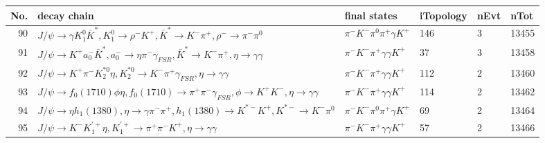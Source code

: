 \begin{table}[htbp] 
\begin{center}
\begin{small}
\begin{tabular}{rlllll}\hline\hline
 No. & decay chain & final states &  iTopology & nEvt & nTot \\\hline
 90&$J/\psi       \rightarrow \gamma       K_1^{0}        \bar{K}^{*}   , K_1^{0}         \rightarrow \rho^{-}      K^{+}          , \bar{K}^{*}    \rightarrow K^{-}          \pi^{+}        , \rho^{-}       \rightarrow \pi^{-}        \pi^{0}        $&$\pi^{-}        K^{-}          \pi^{0}        \pi^{+}        \gamma       K^{+}          $&  146&    3&13455\\
 91&$J/\psi       \rightarrow K^{+}          a_{0}^{-}      \bar{K}^{*}   , a_{0}^{-}       \rightarrow \eta          \pi^{-}        \gamma_{FSR} , \bar{K}^{*}    \rightarrow K^{-}          \pi^{+}        , \eta           \rightarrow \gamma       \gamma       $&$\pi^{-}        K^{-}          \pi^{+}        \gamma       \gamma       K^{+}          $&   37&    3&13458\\
 92&$J/\psi       \rightarrow K^{+}          \pi^{-}        K_2^{*0}       \eta          , K_2^{*0}        \rightarrow K^{-}          \pi^{+}        \gamma_{FSR} , \eta           \rightarrow \gamma       \gamma       $&$\pi^{-}        K^{-}          \pi^{+}        \gamma       \gamma       K^{+}          $&  112&    2&13460\\
 93&$J/\psi       \rightarrow f_{0}(1710)    \phi           \eta          , f_{0}(1710)     \rightarrow \pi^{+}        \pi^{-}        \gamma_{FSR} , \phi            \rightarrow K^{+}          K^{-}          , \eta           \rightarrow \gamma       \gamma       $&$\pi^{-}        K^{-}          \pi^{+}        \gamma       \gamma       K^{+}          $&  114&    2&13462\\
 94&$J/\psi       \rightarrow \eta          h_{1}(1380)    , \eta           \rightarrow \gamma       \pi^{-}        \pi^{+}        , h_{1}(1380)     \rightarrow K^{*-}         K^{+}          , K^{*-}          \rightarrow K^{-}          \pi^{0}        $&$\pi^{-}        K^{-}          \pi^{0}        \pi^{+}        \gamma       K^{+}          $&   69&    2&13464\\
 95&$J/\psi       \rightarrow K^{-}          K_1^{'+}      \eta          , K_1^{'+}       \rightarrow \pi^{+}        \pi^{-}        K^{+}          , \eta           \rightarrow \gamma       \gamma       $&$\pi^{-}        K^{-}          \pi^{+}        \gamma       \gamma       K^{+}          $&   57&    2&13466\\

\end{tabular}
\end{small}
\end{center}
\end{table}
